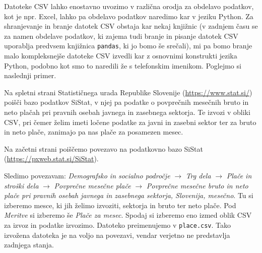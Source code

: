 Datoteke CSV lahko enostavno uvozimo v različna orodja za obdelavo podatkov, kot je npr. Excel, lahko pa obdelavo podatkov naredimo kar v jeziku Python. Za shranjevanje in branje datotek CSV obstaja kar nekaj knjižnic (v zadnjem času se za namen obdelave podatkov, ki zajema tudi branje in pisanje datotek CSV uporablja predvsem knjižnica \texttt{pandas}, ki jo bomo še srečali), mi pa bomo branje malo kompleksnejše datoteke CSV izvedli kar z osnovnimi konstrukti jezika Python, podobno kot smo to naredili že s telefonskim imenikom. Poglejmo si naslednji primer.

\begin{zgled}
Na spletni strani Statističnega urada Republike Slovenije (\url{https://www.stat.si/}) poišči bazo podatkov SiStat, v njej pa podatke o povprečnih mesečnih bruto in neto plačah pri pravnih osebah javnega in zasebnega sektorja. Te izvozi v obliki CSV, pri čemer želim imeti ločene podatke za javni in zasebni sektor ter za bruto in neto plače, zanimajo pa nas plače za posamezen mesec.

\end{zgled}

\begin{resitev}
Na začetni strani poiščemo povezavo na podatkovno bazo SiStat\\ (\url{https://pxweb.stat.si/SiStat}). 

Sledimo povezavam: \emph{Demografsko in socialno področje} $\rightarrow$ \emph{Trg dela} $\rightarrow$ \emph{Plače in stroški dela} $\rightarrow$ \emph{Povprečne mesečne plače} $\rightarrow$ \emph{Povprečne mesečne bruto in neto plače pri pravnih osebah javnega in zasebnega sektorja, Slovenija, mesečno}. Tu si izberemo mesce, ki jih želimo izvoziti, sektorja in bruto ter neto plače. Pod \emph{Meritve} si izberemo še \emph{Plače za mesec}. Spodaj si izberemo eno izmed oblik CSV za izvoz in podatke izvozimo. Datoteko preimenujemo v \texttt{place.csv}. Tako izvožena datoteka je na voljo na povezavi, vendar verjetno ne predstavlja zadnjega stanja. 
\end{resitev}
